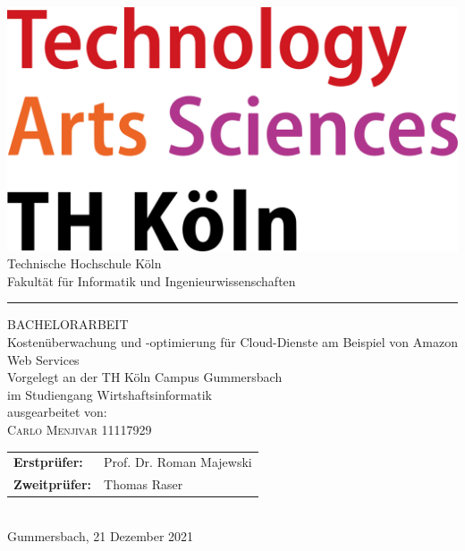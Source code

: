 \documentclass[a4paper,12pt,oneside]{article}
\begin{document}
\pagestyle{empty} %
\newpage %

\newpage
\pagestyle{empty}
\begin{titlepage}
  \begin{center}\includegraphics[scale=0.18]{sources/TH_Koeln_Logo}\\
    \Large
    Technische Hochschule Köln\\
    Fakultät für Informatik und Ingenieurwissenschaften\\
    \hrule\par\rule{0pt}{2cm} %
    \LARGE
    \textsc{BACHELORARBEIT}\\
    \vspace{0.8cm} %
    \huge
    Kostenüberwachung und -optimierung für Cloud-Dienste am Beispiel von Amazon Web Services \\    
    \vspace{0.8cm}
    \large
    Vorgelegt an der TH Köln Campus Gummersbach\\
    im Studiengang Wirtshaftsinformatik\\
    \vspace{0.8cm}
    ausgearbeitet von:\\
    \textsc{Carlo Menjivar} 11117929\\
    \vspace{0.8cm}
    \begin{tabular}{ll} %
      \textbf{Erstprüfer:}  & Prof. Dr. Roman Majewski \\
      \textbf{Zweitprüfer:} & Thomas Raser\\
    \end{tabular}
    \vspace{0.8cm}
    \\Gummersbach, 21 Dezember 2021
  \end{center}
\end{titlepage}
\newpage
\end{document}
